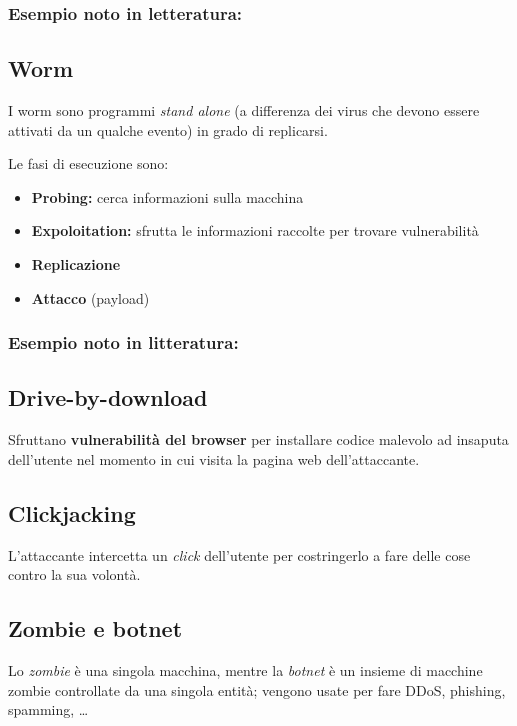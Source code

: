 \documentclass{report}
\begin{document}
\subsubsection{Esempio noto in letteratura:}


\subsection{Worm}
I worm sono programmi \textit{stand alone} (a differenza dei virus che devono essere attivati 
da un qualche evento) in grado di replicarsi.

\noindent Le fasi di esecuzione sono:
\begin{itemize}
    \item \textbf{Probing:} cerca informazioni sulla macchina 
    \item \textbf{Expoloitation:} sfrutta le informazioni raccolte per trovare vulnerabilità
    \item \textbf{Replicazione}
    \item \textbf{Attacco} (payload)
\end{itemize}

\subsubsection{Esempio noto in litteratura:}



\subsection{Drive-by-download}
Sfruttano \textbf{vulnerabilità del browser} per installare codice malevolo ad insaputa dell'utente 
nel momento in cui visita la pagina web dell'attaccante. 

\subsection{Clickjacking}
L'attaccante intercetta un \textit{click} dell'utente per costringerlo a fare delle cose 
contro la sua volontà.

\subsection{Zombie e botnet}
Lo \textit{zombie} è una singola macchina, mentre la \textit{botnet} è un insieme di macchine 
zombie controllate da una singola entità; vengono usate per fare DDoS, phishing, spamming, \dots
\end{document}
